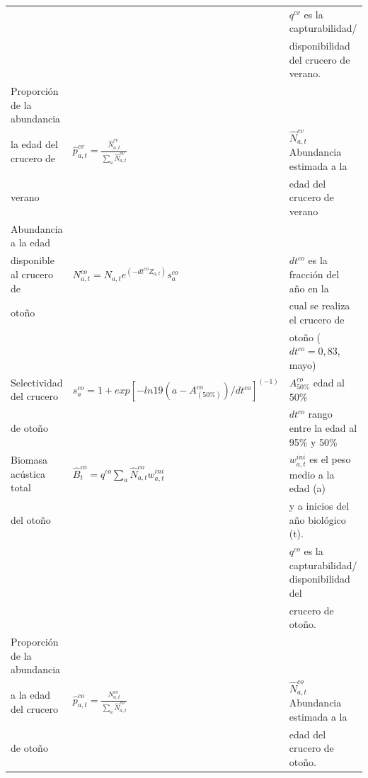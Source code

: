 \documentclass[
  spanish,
]{article}
\begin{document}
\begin{table}[h]
{\begin{tabular}{|l|l|l|}
                           &                                                                     & $q^{cv}$ es la capturabilidad/ \\
                           &                                                                     & disponibilidad del crucero de verano.\\ \hline
Proporción de la abundancia&                                                                     & \\
la edad del crucero de     & $\hat p_{a,t}^{cv}=\frac{\hat N_{a,t}^{cv}}{\sum_a\hat N_{a,t}^{cv}}$& $\hat N_{a,t}^{cv}$ Abundancia estimada a la \\
verano                     &                                                                     & edad del crucero de verano \\ \hline
Abundancia a la edad       &                                                                     & \\
disponible al crucero de   & $N_{a,t}^{co}=N_{a,t} e^{(-dt^{co} Z_{a,t} )} s_a^{co}$             & $dt^{co}$ es la fracción del año en la \\
otoño                      &                                                                     & cual se realiza el crucero de \\
                           &                                                                     & otoño ($dt^{co}=0,83$, mayo) \\ \hline
Selectividad del crucero   & $s_a^{co}=1+exp[-ln19(a-A_{(50\%)}^{co})/dt^{co} ]^{(-1)}$          & $A_{50\%}^{co}$ edad al 50\% \\
de otoño                   &                                                                     & $dt^{co}$ rango entre la edad al 95\% y 50\% \\ \hline
Biomasa acústica total     & $\hat B_t^{co}=q^{co} \sum_a \hat N_{a,t}^{co} w_{a,t}^{ini}$       & $w_{a,t}^{ini}$ es el peso medio a la edad (a) \\
del otoño                  &                                                                     & y a inicios del año biológico (t).\\ 
                           &                                                                     & $q^{co}$ es la capturabilidad/ disponibilidad del \\
                           &                                                                     & crucero de otoño.\\ \hline
Proporción de la abundancia&                                                                     & \\
a la edad del crucero      & $\hat p_{a,t}^{co}=\frac{N_{a,t}^{co}}{\sum_a \hat N_{a,t}^{co}}$   & $\hat N_{a,t}^{co}$ Abundancia estimada a la \\
de otoño                   &                                                                     & edad del crucero de otoño.\\ \hline
  \end{tabular}}
        \end{table}
\end{document}
